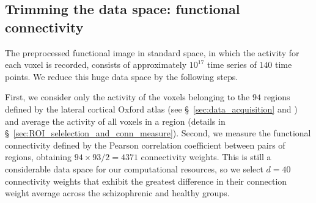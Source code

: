 \documentclass[%
]{frontiersSCNS-nologo} %
\newcommand*{\sect}{\S} %
\renewcommand*{\|}{\mathpunct{|}}%
\newcommand*{\yd}{d}
\begin{document}
\subsection{Trimming the data space: functional connectivity}
\label{sec:data_reduction}


The preprocessed functional image in standard space, in which the activity for each voxel is recorded,  consists of approximately \(10^{17}\)  time series of $140$ time points.  We reduce this huge data space by the following steps. 

First, we consider only the activity of the voxels belonging to the $94$
regions defined by the lateral cortical Oxford atlas (see
\sect~\ref{sec:data_acquisition} and \citealp{Desikan2006}) and average the
activity of all voxels in a region (details in
\sect~\ref{sec:ROI_selelection_and_conn_measure}). Second, we measure the
functional connectivity defined by the Pearson correlation coefficient
between pairs of regions, obtaining \(94\times 93/2=4371\) connectivity
weights. This is still a considerable data space for our computational
resources, so we select $\yd=40$ connectivity weights that exhibit the
greatest difference in their connection weight average across the
schizophrenic and healthy groups.
\end{document}

